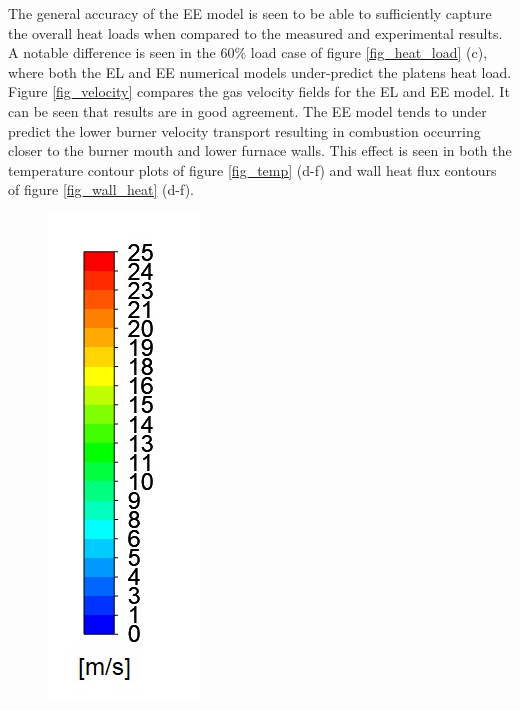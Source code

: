 \documentclass{webofc}
\begin{document}
The general accuracy of the EE model is seen to be able to sufficiently capture the overall heat loads when compared to the measured and experimental results. A notable difference is seen in the 60\% load case of figure \ref{fig_heat_load} (c), where both the EL and EE numerical models under-predict the platens heat load. Figure \ref{fig_velocity} compares the gas velocity fields for the EL and EE model. It can be seen that results are in good agreement. The EE model tends to under predict the lower burner velocity transport resulting in combustion occurring closer to the burner mouth and lower furnace walls. This effect is seen in both the temperature contour plots of figure \ref{fig_temp} (d-f) and wall heat flux contours of figure \ref{fig_wall_heat} (d-f).
\begin{figure}[h!]
\centering
\includegraphics[scale = 0.3]{velo}

\end{figure}
\end{document}
